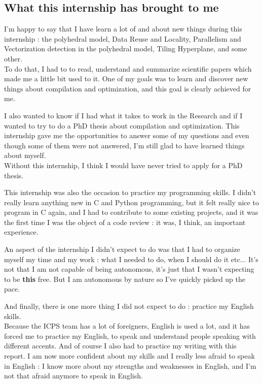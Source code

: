 \documentclass[paper=a4, fontsize=11.5pt]{scrartcl}
\numberwithin{equation}{section}        %
\numberwithin{figure}{section}          %
\numberwithin{table}{section}               %
\begin{document}
    \subsection{What this internship has brought to me}
        I'm happy to say that I have learn a lot of and about new things during this internship :
        the polyhedral model, Data Reuse and Locality, Parallelism and Vectorization detection
        in the polyhedral model, Tiling Hyperplane, and some other.\\
        To do that, I had to to read, understand and summarize scientific papers which made
        me a little bit used to it.
        One of my goals was to learn and discover new things about compilation and optimization,
        and this goal is clearly achieved for me.

        I also wanted to know if I had what it takes to work in the Research and if I wanted
        to try to do a PhD thesis about compilation and optimization. This internship gave me
        the opportunities to answer some of my questions and even though some of them were
        not answered, I'm still glad to have learned things about myself.\\
        Without this internship, I think I would have never tried to apply for a PhD thesis.

        This internship was also the occasion to practice my programming skills. I didn't
        really learn anything new in C and Python programming, but it felt really nice to
        program in C again, and I had to contribute to some existing projects, and it was
        the first time I was the object of a code review : it was, I think, an important experience.

        An aspect of the internship I didn't expect to do was that I had to organize myself
        my time and my work : what I needed to do, when I should do it etc... It's not that I
        am not capable of being autonomous, it's just that I wasn't expecting to be
        \textbf{this} free. But I am autonomous by nature so I've quickly picked up the pace.

        And finally, there is one more thing I did not expect to do : practice my English skills.\\
        Because the ICPS team has a lot of foreigners, English is used a lot, and it has forced
        me to practice my English, to speak and understand people speaking with different accents.
        And of course I also had to practice my writing with this report.
        I am now more confident about my skills and I really less afraid to speak in English
        : I know more about my strengths and weaknesses in English, and I'm not that
        afraid anymore to speak in English.
\end{document}
